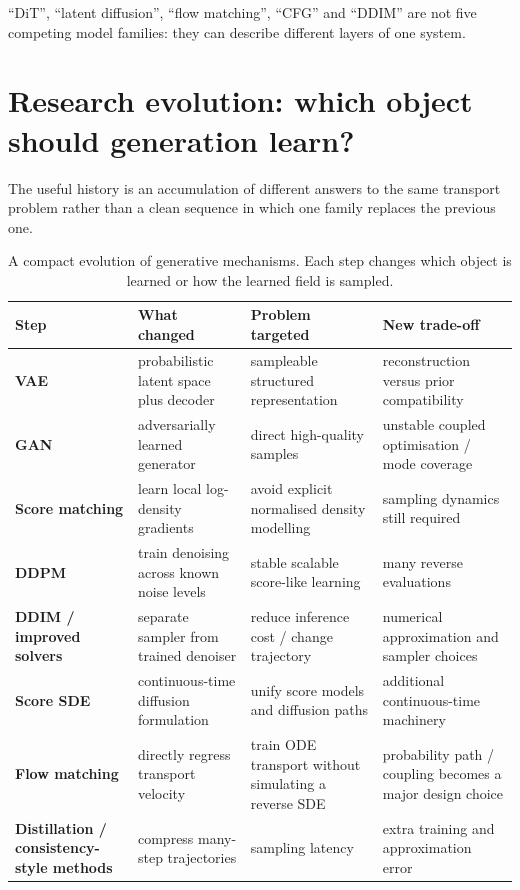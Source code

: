 \begin{calloutintuition}
``DiT'', ``latent diffusion'', ``flow matching'', ``CFG'' and ``DDIM'' are not five competing model families: they can describe different layers of one system.
\end{calloutintuition}

\section{Research evolution: which object should generation learn?}

The useful history is an accumulation of different answers to the same transport problem rather than a clean sequence in which one family replaces the previous one.

\begin{table}[H]
\centering
\small
\begin{tabularx}{\linewidth}{>{\bfseries}l X X X}
\toprule
Step & What changed & Problem targeted & New trade-off \\
\midrule
VAE & probabilistic latent space plus decoder & sampleable structured representation & reconstruction versus prior compatibility \\
GAN & adversarially learned generator & direct high-quality samples & unstable coupled optimisation / mode coverage \\
Score matching & learn local log-density gradients & avoid explicit normalised density modelling & sampling dynamics still required \\
DDPM & train denoising across known noise levels & stable scalable score-like learning & many reverse evaluations \\
DDIM / improved solvers & separate sampler from trained denoiser & reduce inference cost / change trajectory & numerical approximation and sampler choices \\
Score SDE & continuous-time diffusion formulation & unify score models and diffusion paths & additional continuous-time machinery \\
Flow matching & directly regress transport velocity & train ODE transport without simulating a reverse SDE & probability path / coupling becomes a major design choice \\
Distillation / consistency-style methods & compress many-step trajectories & sampling latency & extra training and approximation error \\
\bottomrule
\end{tabularx}
\caption{A compact evolution of generative mechanisms. Each step changes which object is learned or how the learned field is sampled.}
\label{tab:generative-evolution}
\end{table}

